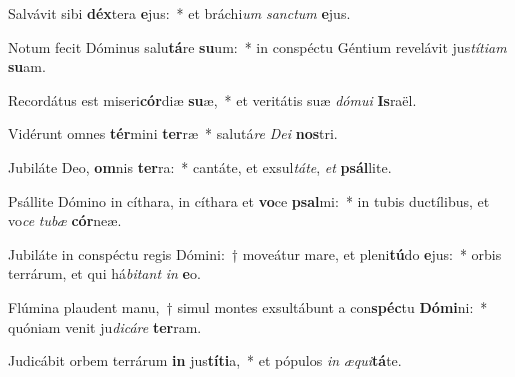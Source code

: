 \item Salvávit sibi \textbf{déx}tera \textbf{e}jus:~* et bráchi\textit{um} \textit{sanc}\textit{tum} \textbf{e}jus.
\item Notum fecit Dóminus salu\textbf{tá}re \textbf{su}um:~* in conspéctu Géntium revelávit jus\textit{tí}\textit{ti}\textit{am} \textbf{su}am.
\item Recordátus est miseri\textbf{cór}diæ \textbf{su}æ,~* et veritátis suæ \textit{dó}\textit{mu}\textit{i} \textbf{Is}raël.
\item Vidérunt omnes \textbf{tér}mini \textbf{ter}ræ~* salutá\textit{re} \textit{De}\textit{i} \textbf{nos}tri.
\item Jubiláte Deo, \textbf{om}nis \textbf{ter}ra:~* cantáte, et exsul\textit{tá}\textit{te}, \textit{et} \textbf{psál}lite.
\item Psállite Dómino in cíthara, in cíthara et \textbf{vo}ce \textbf{psal}mi:~* in tubis ductílibus, et vo\textit{ce} \textit{tu}\textit{bæ} \textbf{cór}neæ.
\item Jubiláte in conspéctu regis Dómini:~† moveátur mare, et pleni\textbf{tú}do \textbf{e}jus:~* orbis terrárum, et qui há\textit{bi}\textit{tant} \textit{in} \textbf{e}o.
\item Flúmina plaudent manu,~† simul montes exsultábunt a con\textbf{spéc}tu \textbf{Dó}\textbf{mi}ni:~* quóniam venit ju\textit{di}\textit{cá}\textit{re} \textbf{ter}ram.
\item Judicábit orbem terrárum \textbf{in} jus\textbf{tí}\textbf{ti}a,~* et pópulos \textit{in} \textit{æ}\textit{qui}\textbf{tá}te.
